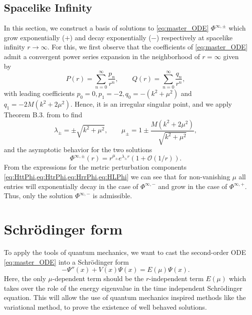 \documentclass[11pt,aip,jmp,amsmath,amssymb,draft]{revtex4-1}
\begin{document}
\subsection{Spacelike Infinity}
In this section, we construct a basis of solutions to \cref{eq:master_ODE} $\Phi^{\infty,\pm}$ which grow exponentially ($+$) and decay exponentially ($-$) respectively at spacelike infinity $r \to \infty$.
For this, we first observe that the coefficients of \cref{eq:master_ODE} admit a convergent power series expansion in the neighborhood of $r = \infty$ given by
\begin{equation}
    P(r) = \sum_{n=0}^\infty \frac{p_n}{r^n}, \qquad Q(r) = \sum_{n=0}^\infty \frac{q_n}{r^n},
\end{equation}
with leading coefficients $p_0 =0, p_1 = -2, q_0 = -(k^2 + \mu^2)$ and $q_1 = -2M(k^2 + 2\mu^2)$. Hence, it is an irregular singular point, and we apply Theorem B.3. from \cite{collingbourne2021gregory} to find
\begin{equation}
    \lambda_\pm =\pm\sqrt{k^2 + \mu^2}, \qquad \mu_\pm = 1 \pm \frac{M(k^2 + 2\mu^2)}{\sqrt{k^2 + \mu^2}},
\end{equation}
and the asymptotic behavior for the two solutions
\begin{equation}
    \Phi^{\infty,\pm}(r) = r^{\mu_\pm} e^{\lambda_\pm r}\left(1 + \mathcal{O}(1/r)\right).
\end{equation}
From the expressions for the metric perturbation components \cref{eq:HttPhi,eq:HtrPhi,eq:HrrPhi,eq:HLPhi} we can see that for non-vanishing $\mu$ all entries will exponentially decay in the case of $\Phi^{\infty,-}$ and grow in the case of $\Phi^{\infty,+}$. Thus, only the solution $\Phi^{\infty,-}$ is admissible.

\section{\label{sec:schroedinger} Schr{\"o}dinger form}
To apply the tools of quantum mechanics, we want to cast the second-order ODE \cref{eq:master_ODE} into a Schr{\"o}dinger form
\begin{equation} \label{eq:schroedinger_form}
    -\Psi''(x) + V(x)\Psi(x) = E(\mu)\Psi(x).
\end{equation}
Here, the only $\mu$-dependent term should be the $r$-independent term $E(\mu)$ which takes over the role of the energy eigenvalue in the time independent Schr{\"o}dinger equation. This will allow the use of quantum mechanics inspired methods like the variational method, to prove the existence of well behaved solutions.
\begin{comment} In addition, we require that the image of $E$ contains $(-\infty, 0]$. Via a variational argument, we can then show that the hermitian operator $\hat H = -\partial_x^2 + V(x)$ has a negative lowest energy eigenvalue and thus the existence of a specific value for $\mu$, for which the \cref{eq:schroedinger_form} has an $L^2$-solution.
\end{comment}
\end{document}
